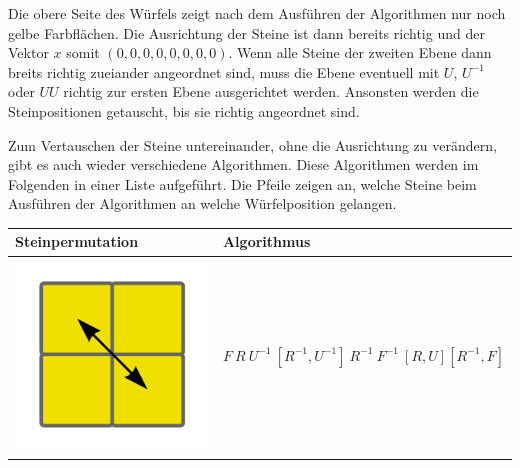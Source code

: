 \documentclass[12pt,a4paper, usenames, dvipsnames]{article}
\theoremstyle{mystyle}
\theoremstyle{definition}
\begin{document}
Die obere Seite des Würfels zeigt nach dem Ausführen der Algorithmen nur noch gelbe Farbflächen. Die Ausrichtung der Steine ist dann bereits richtig und der Vektor $x$ somit $(0,0,0,0,0,0,0,0)$. Wenn alle Steine der zweiten Ebene dann breits richtig zueiander angeordnet sind, muss die Ebene eventuell mit $U$, $U^{-1}$ oder $UU$ richtig zur ersten Ebene ausgerichtet werden.  Ansonsten werden die Steinpositionen getauscht, bis sie richtig angeordnet sind.

Zum Vertauschen der Steine untereinander, ohne die Ausrichtung zu verändern, gibt es auch wieder verschiedene Algorithmen. Diese Algorithmen werden im Folgenden in einer Liste aufgeführt. Die Pfeile zeigen an, welche Steine beim Ausführen der Algorithmen an welche Würfelposition gelangen.

\begin{center}
\begin{tabular}{m{4cm} m{8cm}}
\toprule
Steinpermutation & Algorithmus  \\
\midrule
\includegraphics[scale=0.08]{corners1.png}  & $F \ R \ U^{-1} \ [R^{-1}, U^{-1}] \ R^{-1} \ F^{-1}  \ [R, U]   [R^{-1}, F]$ \\

\end{tabular}
\end{center}
\end{document}
